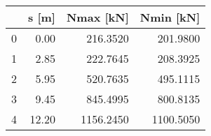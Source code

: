 \begin{tabular}{lrrr}
\toprule
{} &  s [m] &  Nmax [kN] &  Nmin [kN] \\
\midrule
0 &   0.00 &   216.3520 &   201.9800 \\
1 &   2.85 &   222.7645 &   208.3925 \\
2 &   5.95 &   520.7635 &   495.1115 \\
3 &   9.45 &   845.4995 &   800.8135 \\
4 &  12.20 &  1156.2450 &  1100.5050 \\
\bottomrule
\end{tabular}
